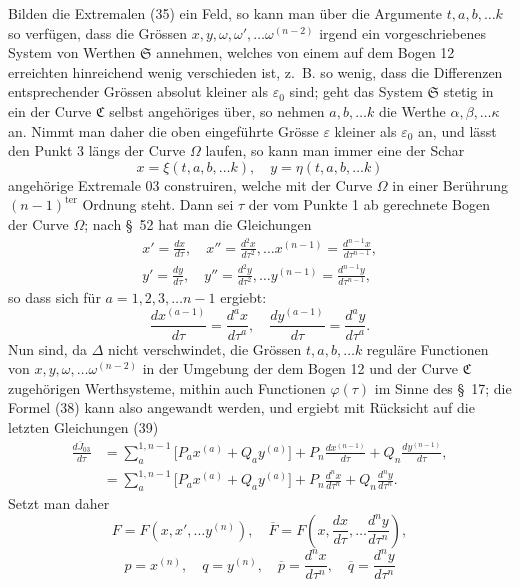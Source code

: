 \documentclass[11pt,a4paper,leqno]{article}
\begin{document}
Bilden die Extremalen (35) ein Feld, so kann man über die Argumente $t,a,b,\ldots k$ so verfügen, dass die Grössen $x,y,\omega,\omega',\ldots\omega^{(n-2)}$ irgend ein vorgeschriebenes System von Werthen $\mathfrak{S}$ annehmen, welches von einem auf dem Bogen 12 erreichten hinreichend wenig verschieden ist, z.~B. so wenig, dass die Differenzen entsprechender Grössen absolut kleiner als $\varepsilon_0$ sind; geht das System $\mathfrak{S}$ stetig in ein der Curve $\mathfrak{C}$ selbst angehöriges über, so nehmen $a,b,\ldots k$ die Werthe $\alpha,\beta,\ldots\kappa$ an. Nimmt man daher die oben eingeführte Grösse $\varepsilon$ kleiner als $\varepsilon_0$ an, und lässt den Punkt 3 längs der Curve $\Omega$ laufen, so kann man immer eine der Schar
\[
x=\xi(t,a,b,\ldots k),\quad y=\eta(t,a,b,\ldots k)
\]
angehörige Extremale 03 construiren, welche mit der Curve $\Omega$ in einer Berührung $(n-1)^{\mathrm{ter}}$ Ordnung steht. Dann sei $\tau$ der vom Punkte 1 ab gerechnete Bogen der Curve $\Omega$; nach \S~52 hat man die Gleichungen
\begin{equation}\tag{39}
\begin{gathered}
x'=\frac{dx}{d\tau},\quad x''=\frac{d^2x}{d\tau^2},\ldots
x^{(n-1)}=\frac{d^{n-1}x}{d\tau^{n-1}},\\
y'=\frac{dy}{d\tau},\quad y''=\frac{d^2y}{d\tau^2},\ldots
y^{(n-1)}=\frac{d^{n-1}y}{d\tau^{n-1}},
\end{gathered}
\end{equation}
so dass sich für $a=1,2,3,\ldots n-1$ ergiebt:
\[
\frac{dx^{(a-1)}}{d\tau}=\frac{d^a x}{d\tau^a},\quad
\frac{dy^{(a-1)}}{d\tau}=\frac{d^a y}{d\tau^a}.
\]
Nun sind, da $\Delta$ nicht verschwindet, die Grössen $t,a,b,\ldots k$ reguläre Functionen von $x,y,\omega,\ldots\omega^{(n-2)}$ in der Umgebung der dem Bogen 12 und der Curve $\mathfrak{C}$ zugehörigen Werthsysteme, mithin
auch Functionen $\varphi(\tau)$ im Sinne des \S~17; die Formel (38) kann also angewandt werden, und ergiebt mit Rücksicht auf die letzten Gleichungen (39)
\[
\begin{aligned}
\frac{d\overline{J}_{03}}{d\tau}
&=\sum_a^{1,n-1}\bigl[P_ax^{(a)}+Q_ay^{(a)}\bigr]
+P_n\frac{dx^{(n-1)}}{d\tau}
+Q_n\frac{dy^{(n-1)}}{d\tau},\\
&=\sum_a^{1,n-1}\bigl[P_ax^{(a)}+Q_ay^{(a)}\bigr]
+P_n\frac{d^n x}{d\tau^n}
+Q_n\frac{d^n y}{d\tau^n}.
\end{aligned}
\]
Setzt man daher
\[
F=F(x,x',\ldots y^{(n)}),\quad
\overline{F}=F\left(x,\frac{dx}{d\tau},\ldots\frac{d^n y}{d\tau^n}\right),
\]
\[
p=x^{(n)},\quad q=y^{(n)},\quad
\overline{p}=\frac{d^n x}{d\tau^n},\quad
\overline{q}=\frac{d^n y}{d\tau^n}
\]
\end{document}
